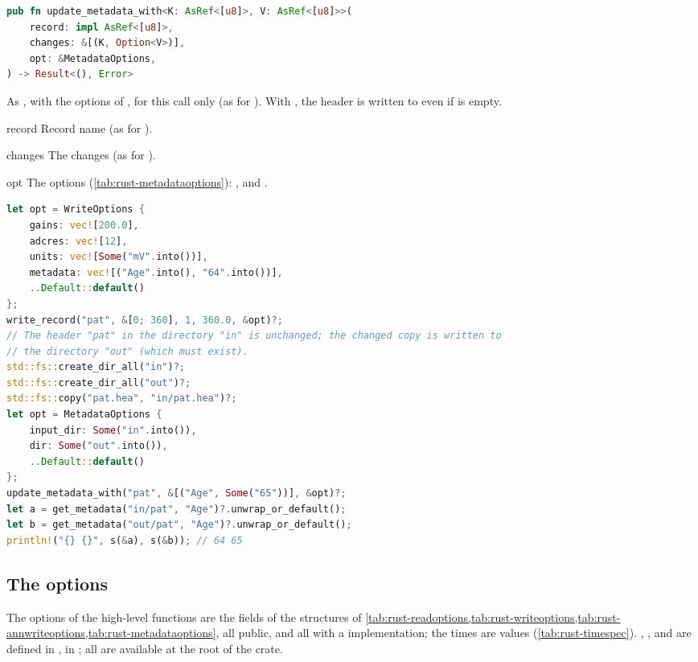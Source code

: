 \begin{lstlisting}[language=Rust,style=signature]
pub fn update_metadata_with<K: AsRef<[u8]>, V: AsRef<[u8]>>(
    record: impl AsRef<[u8]>,
    changes: &[(K, Option<V>)],
    opt: &MetadataOptions,
) -> Result<(), Error>
\end{lstlisting}
As , with the options of , for this call only (as for
). With , the header is written to  even if
 is empty.
\begin{params}
\item[record] Record name (as for ).
\item[changes] The changes (as for ).
\item[opt] The options (\cref{tab:rust-metadataoptions}): ,
   and .
\end{params}
\begin{lstlisting}[language=Rust,style=example]
let opt = WriteOptions {
    gains: vec![200.0],
    adcres: vec![12],
    units: vec![Some("mV".into())],
    metadata: vec![("Age".into(), "64".into())],
    ..Default::default()
};
write_record("pat", &[0; 360], 1, 360.0, &opt)?;
// The header "pat" in the directory "in" is unchanged; the changed copy is written to
// the directory "out" (which must exist).
std::fs::create_dir_all("in")?;
std::fs::create_dir_all("out")?;
std::fs::copy("pat.hea", "in/pat.hea")?;
let opt = MetadataOptions {
    input_dir: Some("in".into()),
    dir: Some("out".into()),
    ..Default::default()
};
update_metadata_with("pat", &[("Age", Some("65"))], &opt)?;
let a = get_metadata("in/pat", "Age")?.unwrap_or_default();
let b = get_metadata("out/pat", "Age")?.unwrap_or_default();
println!("{} {}", s(&a), s(&b)); // 64 65
\end{lstlisting}

\subsection{The options}
\label{sec:rust-options}

The options of the high-level functions are the fields of the structures of
\cref{tab:rust-readoptions,tab:rust-writeoptions,tab:rust-annwriteoptions,tab:rust-metadataoptions},
all public, and all with a  implementation; the times are 
values (\cref{tab:rust-timespec}). , ,
 and  are defined in ,
 in ; all are available at the root of the
crate.

